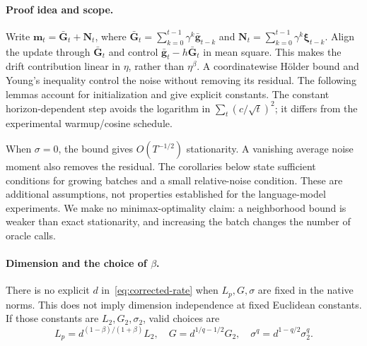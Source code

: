 \documentclass[10pt,a4paper]{amsart}
\begin{document}
\paragraph{Proof idea and scope.}
Write $\mathbf{m}_t=\bar{\mathbf{G}}_t+\mathbf{N}_t$, where $\bar{\mathbf{G}}_t=\sum_{k=0}^{t-1}\gamma^k\bar{\mathbf{g}}_{t-k}$ and $\mathbf{N}_t=\sum_{k=0}^{t-1}\gamma^k\bm{\xi}_{t-k}$. Align the update through $\bar{\mathbf{G}}_t$ and control $\bar{\mathbf{g}}_t-h\bar{\mathbf{G}}_t$ in mean square. This makes the drift contribution linear in $\eta$, rather than $\eta^\beta$. A coordinatewise H\"older bound and Young's inequality control the noise without removing its residual. The following lemmas account for initialization and give explicit constants. The constant horizon-dependent step avoids the logarithm in $\sum_t(c/\sqrt t)^2$; it differs from the experimental warmup/cosine schedule.

When $\sigma=0$, the bound gives $O(T^{-1/2})$ stationarity. A vanishing average noise moment also removes the residual. The corollaries below state sufficient conditions for growing batches and a small relative-noise condition. These are additional assumptions, not properties established for the language-model experiments. We make no minimax-optimality claim: a neighborhood bound is weaker than exact stationarity, and increasing the batch changes the number of oracle calls.

\paragraph{Dimension and the choice of $\beta$.}
There is no explicit $d$ in~\eqref{eq:corrected-rate} when $L_p,G,\sigma$ are fixed in the native norms. This does not imply dimension independence at fixed Euclidean constants. If those constants are $L_2,G_2,\sigma_2$, valid choices are
\begin{equation}\label{eq:dimension-conversion}
L_p=d^{(1-\beta)/(1+\beta)}L_2,\quad
G=d^{1/q-1/2}G_2,\quad
\sigma^q=d^{1-q/2}\sigma_2^q.
\end{equation}
\end{document}

